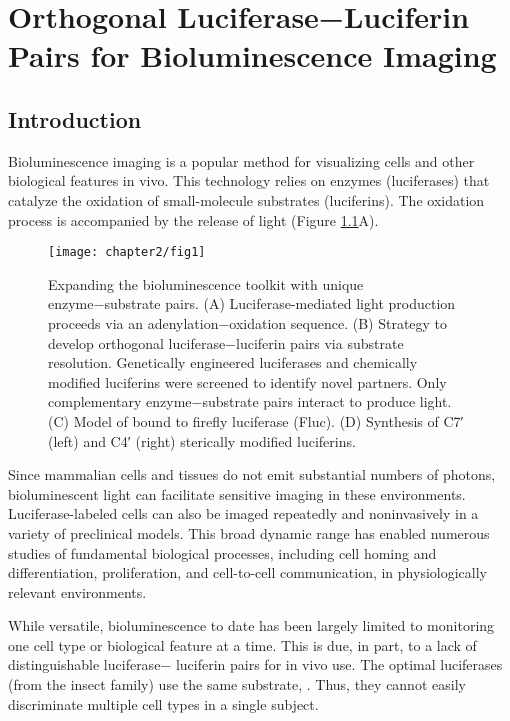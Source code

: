 
\chapter{Orthogonal Luciferase−Luciferin Pairs for Bioluminescence Imaging}
\label{chap:orthog}
\section{Introduction}
Bioluminescence imaging is a popular method for visualizing
cells and other biological features in vivo.\cite{RN26} This technology
relies on enzymes (luciferases) that catalyze the oxidation of
small-molecule substrates (luciferins). The oxidation process is
accompanied by the release of light (Figure \ref{fig:overview}A).
\begin{figure}[htbp]
\texttt{[image: chapter2/fig1]}
\centering
\caption[Expanding the bioluminescence toolkit with unique
enzyme−substrate pairs]{Expanding the bioluminescence toolkit with unique
enzyme−substrate pairs. (A) Luciferase-mediated light production
proceeds via an adenylation−oxidation sequence. (B) Strategy to
develop orthogonal luciferase−luciferin pairs via substrate resolution.
Genetically engineered luciferases and chemically modified luciferins
were screened to identify novel partners. Only complementary
enzyme−substrate pairs interact to produce light. (C) Model of \dluciferin{}
bound to firefly luciferase (Fluc). (D) Synthesis of C7′ (left)
and C4′ (right) sterically modified luciferins.}
  \label{fig:overview}
\end{figure}
Since
mammalian cells and tissues do not emit substantial numbers
of photons, bioluminescent light can facilitate sensitive imaging
in these environments.\cite{Prescher:2010dv} Luciferase-labeled cells can also be
imaged repeatedly and noninvasively in a variety of preclinical
models. This broad dynamic range has enabled numerous
studies of fundamental biological processes, including cell
homing and differentiation, proliferation, and cell-to-cell
communication, in physiologically relevant environments.\cite{Badr:2011if}
\par
While versatile, bioluminescence to date has been largely
limited to monitoring one cell type or biological feature at a
time. This is due, in part, to a lack of distinguishable luciferase−
luciferin pairs for in vivo use. The optimal luciferases (from the
insect family) use the same substrate, \dluciferin{}.\cite{RN26,RN101} Thus, they
cannot easily discriminate multiple cell types in a single subject.
